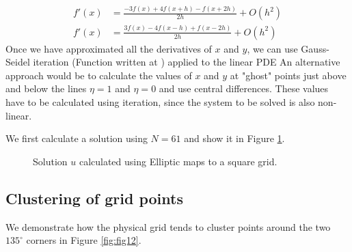 \documentclass{article}
\numberwithin{equation}{section}
\theoremstyle{definition}
\begin{document}
\begin{align}
    \label{eq:forwardoh2}
    f'(x) &= \frac{-3f(x) + 4f(x+h) - f(x+2h)}{2h} + O(h^2) \\
    f'(x) &= \frac{3f(x) - 4f(x-h) + f(x-2h)}{2h} + O(h^2) \nonumber
\end{align}
Once we have approximated all the derivatives of $x$ and $y$, we can use Gauss-Seidel iteration (Function written at ) applied to the linear PDE
An alternative approach would be to calculate the values of $x$ and $y$ at "ghost" points just above and below the lines $\eta=1$ and $\eta=0$ and use central differences. These values have to be calculated using iteration, since the system to be solved is also non-linear.

We first calculate a solution using $N=61$ and show it in Figure \ref{fig:fig11}.
\begin{figure}[H]
    \centering
    \hfill
    \caption{Solution $u$ calculated using Elliptic maps to a square grid.}
    \label{fig:fig11}
\end{figure}

\subsection{Clustering of grid points}
We demonstrate how the physical grid tends to cluster points around the two $135^{\circ} $ corners in Figure \ref{fig:fig12}. 
\end{document}
